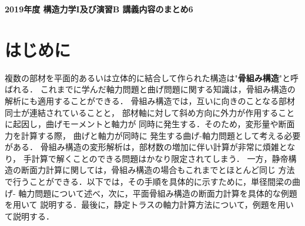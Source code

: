 \documentclass[10pt,a4j]{jarticle}
\newlength{\minitwocolumn}
\begin{document}
\newcommand{\fat}[1]{\mbox{\boldmath $#1$}}
\newcommand{\D}{\partial}
\newcommand{\w}{\omega}
\newcommand{\ga}{\alpha}
\newcommand{\gb}{\beta}
\newcommand{\gx}{\xi}
\newcommand{\gz}{\zeta}
\newcommand{\vhat}[1]{\hat{\fat{#1}}}
\newcommand{\spc}{\vspace{0.7\baselineskip}}
\newcommand{\halfspc}{\vspace{0.3\baselineskip}}

\newcommand{\twofig}[2]
 {
   \begin{figure}
     \begin{minipage}[t]{\minitwocolumn}
         \begin{center}   #1
         \end{center}
     \end{minipage}
         \hspace{\columnsep}
     \begin{minipage}[t]{\minitwocolumn}
         \begin{center} #2
         \end{center}
     \end{minipage}
   \end{figure}
 }
\begin{center}
	{\Large \bf 2019年度 構造力学I及び演習B 講義内容のまとめ6} \\
\end{center}
\section{はじめに}
複数の部材を平面的あるいは立体的に結合して作られた構造は"{\bf 骨組み構造}"と呼ばれる．
これまでに学んだ軸力問題と曲げ問題に関する知識は，骨組み構造の解析にも適用することができる．
骨組み構造では，互いに向きのことなる部材同士が連結されていることと，
部材軸に対して斜め方向に外力が作用することに起因し，曲げモーメントと軸力が
同時に発生する．そのため，変形量や断面力を計算する際， 曲げと軸力が同時に
発生する曲げ-軸力問題として考える必要がある．
骨組み構造の変形解析は，部材数の増加に伴い計算が非常に煩雑となり，
手計算で解くことのできる問題はかなり限定されてしまう．
一方，静帝構造の断面力計算に関しては，骨組み構造の場合もこれまでとほとんど同じ
方法で行うことができる．以下では，その手順を具体的に示すために，単径間梁の曲げ-
軸力問題について述べ，次に，平面骨組み構造の断面力計算を具体的な例題を用いて
説明する．最後に，静定トラスの軸力計算方法について，例題を用いて説明する．
\end{document}
